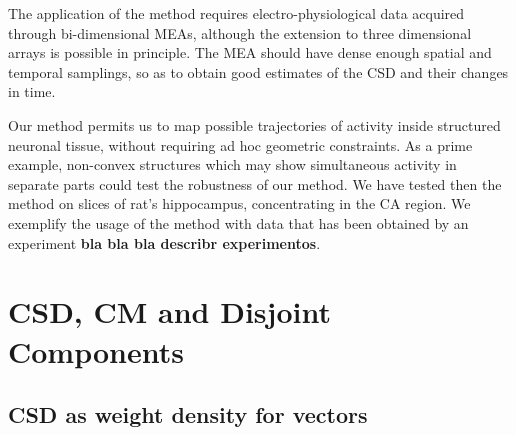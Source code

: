 \documentclass{article}
\begin{document}
The application of the method requires electro-physiological data acquired through bi-dimensional MEAs, although the extension to three dimensional arrays is possible in principle. The MEA should have dense enough spatial and temporal samplings, so as to obtain good estimates of the CSD and their changes in time.

Our method permits us to map possible trajectories of activity inside structured neuronal tissue, without requiring ad hoc geometric constraints. As a prime example, non-convex structures which may show simultaneous activity in separate parts could test the robustness of our method. We have tested then the method on slices of rat's hippocampus, concentrating in the CA region. We exemplify the usage of the method with data that has been obtained by an experiment \textbf{bla bla bla describr experimentos}.




\section{CSD, CM and Disjoint Components}

\subsection{CSD as weight density for vectors}
\end{document}
